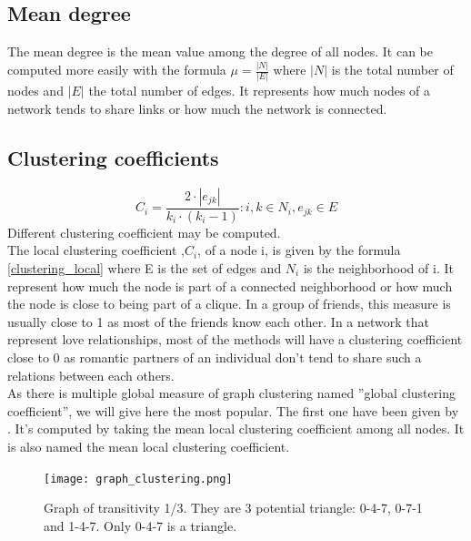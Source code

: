 \documentclass[a4paper, 12pt]{report}
\begin{document}
\subsection{Mean degree}
The mean degree is the mean value among the degree of all nodes. It can be computed more easily with the formula $\mu = \frac{|N|}{|E|}$ where $|N|$ is the total number of nodes and $|E|$ the total number of edges. It represents how much nodes of a network tends to share links or  how much the network is connected.

\subsection{Clustering coefficients}
\begin{equation}
C_i = \frac{2 \cdot |e_{jk}|}{k_i \cdot (k_i - 1)}: i, k \in N_i, e_{jk} \in E
\label{clustering_local}
\end{equation}
Different clustering coefficient may be computed.\\
The local clustering coefficient ,$C_i$, of a node i, is given by the formula \ref{clustering_local} where E is the set of edges and $N_i$ is the neighborhood of i. It represent how much the node is part of a connected neighborhood or how much the node is close to being part of a clique. In a group of friends, this measure is usually close to 1 as most of the friends know each other. In a network that represent love relationships, most of the methods will have a clustering coefficient close to 0 as romantic partners of an individual don't tend to share such a relations between each others.\\

As there is multiple global measure of graph clustering named ''global clustering coefficient'', we will give here the most popular. The first one have been given by \cite{globalClustering1}. It's computed by taking the mean local clustering coefficient among all nodes. It is also named the mean local clustering coefficient.  \\

\begin{figure}
\centering
\texttt{[image: graph\_clustering.png]}
\caption{Graph of transitivity 1/3. They are 3 potential triangle: 0-4-7, 0-7-1 and 1-4-7. Only 0-4-7 is a triangle. }
\label{transitivity}
\end{figure}
\end{document}
